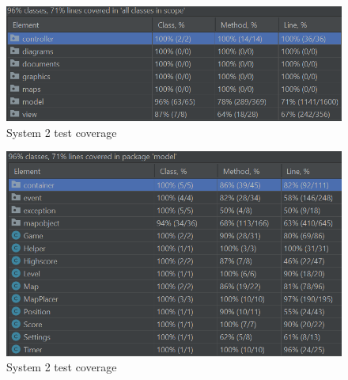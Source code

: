 \documentclass[]{article}
\begin{document}
\begin{figure}[h!]
\centering
\includegraphics[width=0.75\linewidth]{testCovS2.png}
\caption{System 2 test coverage}
\label{fig:acov}
\end{figure}

\begin{figure}[h!]
\centering
\includegraphics[width=0.75\linewidth]{testCov2S2.png}
\caption{System 2 test coverage}
\label{fig:acov2}
\end{figure}



 
\end{document}
